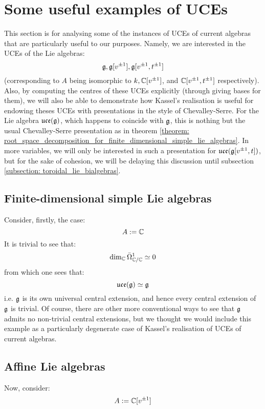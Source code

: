 \section{Some useful examples of UCEs}
    This section is for analysing some of the instances of UCEs of current algebras that are particularly useful to our purposes. Namely, we are interested in the UCEs of the Lie algebras:
        $$\mathfrak{g}, \mathfrak{g}[v^{\pm 1}], \mathfrak{g}[v^{\pm 1}, t^{\pm 1}]$$
    (corresponding to $A$ being isomorphic to $k, \mathbb{C}[v^{\pm 1}]$, and $\mathbb{C}[v^{\pm 1}, t^{\pm 1}]$ respectively). Also, by computing the centres of these UCEs explicitly (through giving bases for them), we will also be able to demonstrate how Kassel's realisation is useful for endowing theses UCEs with presentations in the style of Chevalley-Serre. For the Lie algebra $\mathfrak{uce}(\mathfrak{g})$, which happens to coincide with $\mathfrak{g}$, this is nothing but the usual Chevalley-Serre presentation as in theorem \ref{theorem: root_space_decomposition_for_finite_dimensional_simple_lie_algebras}. In more variables, we will only be interested in such a presentation for $\mathfrak{uce}(\mathfrak{g}[v^{\pm 1}, t])$, but for the sake of cohesion, we will be delaying this discussion until subsection \ref{subsection: toroidal_lie_bialgebras}.

    \subsection{Finite-dimensional simple Lie algebras}
        Consider, firstly, the case:
            $$A := \mathbb{C}$$
        It is trivial to see that:
            $$\dim_{\mathbb{C}} \bar{\Omega}^1_{\mathbb{C}/\mathbb{C}} \simeq 0$$
        from which one sees that:
            $$\mathfrak{uce}(\mathfrak{g}) \simeq \mathfrak{g}$$
        i.e. $\mathfrak{g}$ is its own universal central extension, and hence every central extension of $\mathfrak{g}$ is trivial. Of course, there are other more conventional ways to see that $\mathfrak{g}$ admits no non-trivial central extensions, but we thought we would include this example as a particularly degenerate case of Kassel's realisation of UCEs of current algebras.

    \subsection{Affine Lie algebras}
        Now, consider:
            $$A := \mathbb{C}[v^{\pm 1}]$$
    
